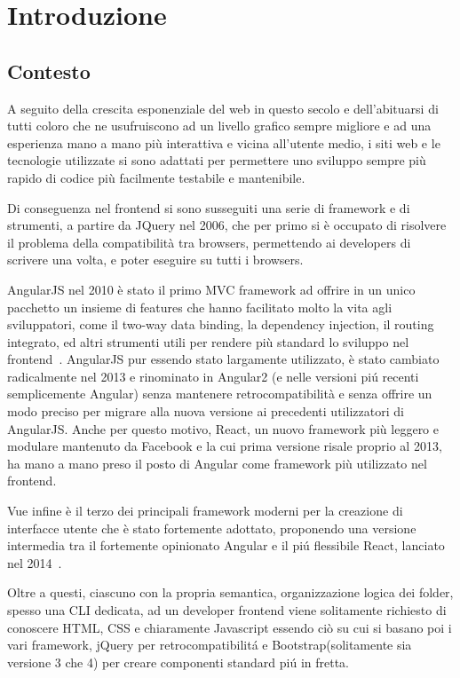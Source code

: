 \chapter{Introduzione}\label{cap:introduzione}

\section{Contesto}\label{sez:contesto}

A seguito della crescita esponenziale del web in questo secolo e dell'abituarsi di tutti coloro che ne usufruiscono ad un livello grafico sempre migliore e ad una esperienza mano a mano pi\`u interattiva e vicina all'utente medio, i siti web e le tecnologie utilizzate si sono adattati per permettere uno sviluppo sempre pi\`u rapido di codice pi\`u facilmente testabile e mantenibile.

Di conseguenza nel frontend si sono susseguiti una serie di framework e di strumenti, a partire da JQuery\cite{jquery} nel 2006, che per primo si \`e occupato di risolvere il problema della compatibilit\`a tra browsers, permettendo ai developers di scrivere una volta, e poter eseguire su tutti i browsers.

AngularJS nel 2010 \`e stato il primo MVC framework ad offrire in un unico pacchetto un insieme di features che hanno facilitato molto la vita agli sviluppatori, come il two-way data binding, la dependency injection, il routing integrato, ed altri strumenti utili per rendere pi\`u standard lo sviluppo nel frontend~\cite{Hoff}.
AngularJS pur essendo stato largamente utilizzato, \`e stato cambiato radicalmente nel 2013 e rinominato in Angular2 (e nelle versioni pi\'u recenti semplicemente Angular) senza mantenere retrocompatibilit\`a e senza offrire un modo preciso per migrare alla nuova versione ai precedenti utilizzatori di AngularJS.
Anche per questo motivo, React, un nuovo framework pi\`u leggero e modulare mantenuto da Facebook e la cui prima versione risale proprio al 2013, ha mano a mano preso il posto di Angular come framework pi\`u utilizzato nel frontend.

Vue infine \`e il terzo dei principali framework moderni per la creazione di interfacce utente che \`e stato fortemente adottato, proponendo una versione intermedia tra il fortemente opinionato Angular e il pi\'u flessibile React, lanciato nel 2014~\cite{vueJs}.

Oltre a questi, ciascuno con la propria semantica, organizzazione logica dei folder, spesso una CLI dedicata, ad un developer frontend viene solitamente richiesto di conoscere HTML, CSS e chiaramente Javascript essendo ci\`o su cui si basano poi i vari framework, jQuery per retrocompatibilit\'a e Bootstrap(solitamente sia versione 3 che 4) per creare componenti standard pi\'u in fretta.

